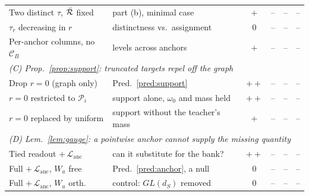 \begin{table}[t]
\begin{tabular}{llcccc}
Two distinct $\tau$, $\bar{\mathcal{R}}$ fixed & part (b), minimal case & $+$ & -- & -- & -- \\
$\tau_r$ decreasing in $r$ & distinctness vs.\ assignment & $0$ & -- & -- & -- \\
Per-anchor columns, no $\mathcal{C}_B$ & levels across anchors & $+$ & -- & -- & -- \\
\midrule
\multicolumn{6}{l}{\emph{(C) Prop.~\ref{prop:support}: truncated targets repel off the graph}}\\
Drop $r=0$ (graph only) & Pred.~\ref{pred:support} & $++$ & -- & -- & -- \\
\quad $r{=}0$ restricted to $\mathcal{P}_i$ & support alone, $\omega_0$ and mass held & $++$ & -- & -- & -- \\
\quad $r{=}0$ replaced by uniform & support without the teacher's mass & $+$ & -- & -- & -- \\
\midrule
\multicolumn{6}{l}{\emph{(D) Lem.~\ref{lem:gauge}: a pointwise anchor cannot supply the missing quantity}}\\
Tied readout $+\,\mathcal{L}_{\mathrm{anc}}$ & can it substitute for the bank? & $++$ & -- & -- & -- \\
Full $+\,\mathcal{L}_{\mathrm{anc}}$, $W_a$ free & Pred.~\ref{pred:anchor}, a null & $0$ & -- & -- & -- \\
Full $+\,\mathcal{L}_{\mathrm{anc}}$, $W_a$ orth. & control: $GL(d_S)$ removed & $0$ & -- & -- & -- \\
\bottomrule
\end{tabular}
\end{table}
